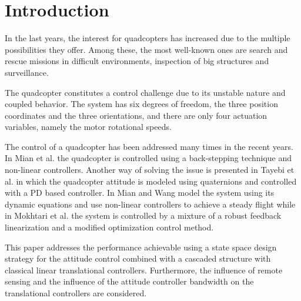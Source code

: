 \section{Introduction}
In the last years, the interest for quadcopters has increased due to the multiple possibilities they offer. Among these, the most well-known ones are search and rescue missions in difficult environments, inspection of big structures and surveillance. \nolinebreak\cite{droneuses}

The quadcopter constitutes a control challenge due to its unstable nature and coupled behavior. The system has six degrees of freedom, the three position coordinates and the three orientations, and there are only four actuation variables, namely the motor rotational speeds. \cite{draganflyer}%

The control of a quadcopter has been addressed many times in the recent years. In Mian et al. \cite{backstepping} the quadcopter is controlled using a back-stepping technique and non-linear controllers. Another way of solving the issue is presented in Tayebi et al. \cite{quaternionsPD} in which the quadcopter attitude is modeled using quaternions and controlled with a PD based controller. In \cite{MianWang} Mian and Wang model the system using its dynamic equations and use non-linear controllers to achieve a steady flight while in Mokhtari et al. \cite{GHinf} the system is controlled by a mixture of a robust feedback linearization and a modified optimization control method.

This paper addresses the performance achievable using a state space design  strategy for the attitude control combined with a cascaded structure with classical linear translational controllers. Furthermore, the influence of remote sensing and the influence of the attitude controller bandwidth on the translational controllers are considered.
%

